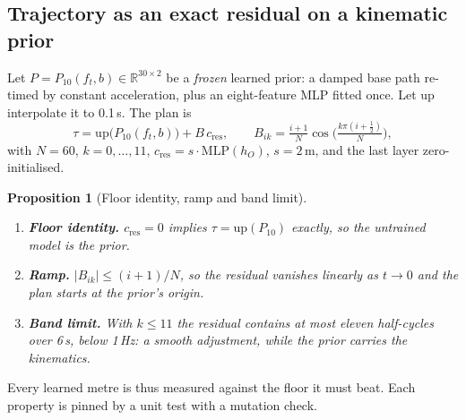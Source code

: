 \documentclass[10pt,twocolumn]{article}
\newtheorem{proposition}{Proposition}
\theoremstyle{remark}
\newcommand{\Rset}{\mathbb{R}}
\begin{document}
\subsection{Trajectory as an exact residual on a kinematic prior}
Let $P=P_{10}(f_t,b)\in\Rset^{30\times2}$ be a \emph{frozen} learned prior: a damped base path re-timed by constant acceleration, plus an
eight-feature MLP fitted once. Let $\mathrm{up}$ interpolate it to 0.1\,s. The plan is
\begin{equation}\label{eq:traj}
\boxed{\;\tau=\mathrm{up}\big(P_{10}(f_t,b)\big)+B\,c_{\mathrm{res}},\qquad B_{ik}=\tfrac{i+1}{N}\cos\!\Big(\tfrac{k\pi(i+\frac12)}{N}\Big),\;}
\end{equation}
with $N=60$, $k=0,\dots,11$, $c_{\mathrm{res}}=s\cdot\mathrm{MLP}(h_O)$, $s=2$\,m, and the last layer zero-initialised.

\begin{proposition}[Floor identity, ramp and band limit]
\begin{enumerate}[label=(\alph*)]
  \item \textbf{Floor identity.} $c_{\mathrm{res}}=0$ implies $\tau=\mathrm{up}(P_{10})$ exactly, so the untrained model \emph{is} the prior.
  \item \textbf{Ramp.} $|B_{ik}|\le(i+1)/N$, so the residual vanishes linearly as $t\to0$ and the plan starts at the prior's origin.
  \item \textbf{Band limit.} With $k\le11$ the residual contains at most eleven half-cycles over 6\,s, below 1\,Hz: a smooth adjustment,
        while the prior carries the kinematics.
\end{enumerate}
\end{proposition}
Every learned metre is thus measured against the floor it must beat. Each property is pinned by a unit test with a mutation check.
\end{document}
